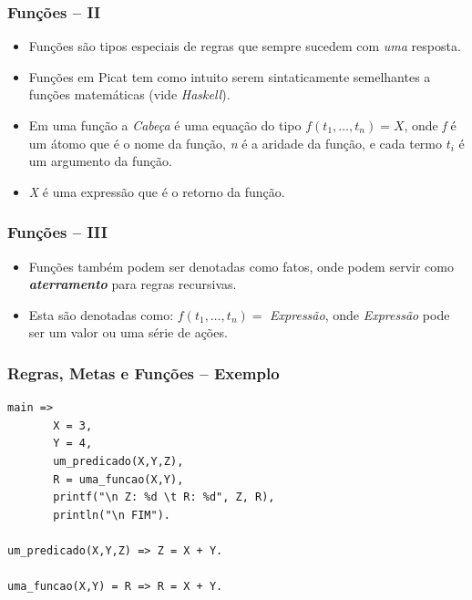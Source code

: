 \begin{frame}[fragile]
	\frametitle{Funções -- II}

    
    \begin{itemize}
        \item Funções são tipos especiais de regras que sempre sucedem com \emph{uma} 
        resposta.
        
        \pause
        \item Funções em Picat tem como intuito serem sintaticamente semelhantes a funções matemáticas (vide \emph{Haskell}).
        
        \pause
        \item Em uma função a \emph{Cabeça} é uma equação do tipo $f(t_1,\ldots,t_n)=X$, onde
        \emph{f} é um átomo que é o nome da função, \emph{n} é a aridade da função, e cada
        termo $t_i$ é um argumento da função.
        
        \item \emph{X} é uma expressão que é o retorno da função.
        
    \end{itemize}
    
\end{frame}
    
\begin{frame}[fragile]
	\frametitle{Funções  -- III}
    
    \begin{itemize}
    
        \item Funções também podem ser denotadas como fatos, onde podem servir como 
        \textbf{\textit{aterramento}} para regras recursivas.
        
        
        \item Esta são denotadas como: $f(t_1,\ldots,t_n) = $ \emph{Expressão}, onde \textit{Expressão}
        pode ser um valor ou uma série de ações.
        
    \end{itemize}
    
\end{frame}

\begin{frame}[fragile]
\frametitle{Regras, Metas e Funções -- Exemplo}

\begin{footnotesize}
\begin{verbatim}
main =>
       X = 3, 
       Y = 4,
       um_predicado(X,Y,Z),
       R = uma_funcao(X,Y),
       printf("\n Z: %d \t R: %d", Z, R),
       println("\n FIM"). 
       
um_predicado(X,Y,Z) => Z = X + Y.

uma_funcao(X,Y) = R => R = X + Y.
\end{verbatim}

\end{footnotesize}
\end{frame}


